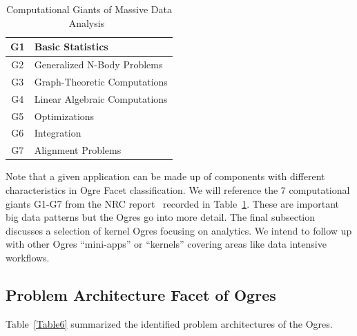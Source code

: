 \documentclass{acm_proc_article-sp}
\begin{document}
\begin{table}[h]
\centering
\caption{ Computational Giants of Massive Data Analysis~\cite{b13}}
\label{Table5}
\begin{tabular}{|c|p{5cm}|} \hline
G1 & Basic Statistics \\ \hline
G2 & Generalized N-Body Problems \\ \hline
G3 & Graph-Theoretic Computations \\ \hline 
G4 & Linear Algebraic Computations \\ \hline
G5 & Optimizations \\ \hline
G6 & Integration \\ \hline
G7 & Alignment Problems 
\\ \hline
\end{tabular}
\end{table}

Note that a given application can be made up of components with different
characteristics in Ogre Facet classification. We will reference the 7
computational giants G1-G7 from the NRC report~\cite{b13} recorded in
Table~\ref{Table5}. These are important big data patterns but the Ogres go into
more detail. The final subsection discusses a selection of kernel Ogres
focusing on analytics. We intend to follow up with other Ogres ``mini-apps'' or
``kernels'' covering areas like data intensive workflows.


\subsection{Problem Architecture Facet of Ogres}

Table~\ref{Table6} summarized the identified problem architectures of the Ogres.
\end{document}
